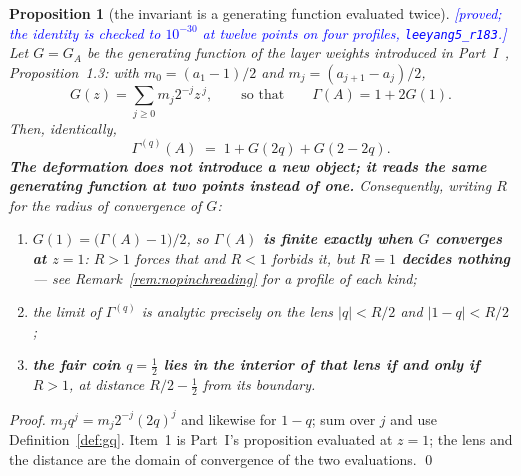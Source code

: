 \documentclass[11pt,a4paper]{article}
\theoremstyle{plain}
\newtheorem{proposition}[theorem]{Proposition}
\theoremstyle{definition}
\theoremstyle{remark}
\newcommand{\STATUS}[1]{\textcolor{blue}{\textsf{[#1]}}}
\newcommand{\Xref}[3]{#3}
\begin{document}
\begin{proposition}[the invariant is a generating function evaluated twice]\label{prop:gqgen}
\STATUS{proved; the identity is checked to $10^{-30}$ at twelve points on four profiles,
\texttt{leeyang5\_r183}.}
Let $G=G_A$ be the generating function of the layer weights introduced in
Part~I~\cite{P1}, Proposition~\Xref{paper}{prop:gengamma}{1.3}: with $m_0=(a_1-1)/2$ and
$m_j=(a_{j+1}-a_j)/2$,
\[
  G(z)=\sum_{j\ge0}m_j2^{-j}z^{\,j},
  \qquad\text{so that}\qquad \Gamma(A)=1+2G(1).
\]
Then, identically,
\[
  \Gamma^{(q)}(A)\;=\;1+G(2q)+G(2-2q).
\]
\textbf{The deformation does not introduce a new object; it reads the same generating function
at two points instead of one.} Consequently, writing $R$ for the radius of convergence of $G$:
\begin{enumerate}
\item $G(1)=\bigl(\Gamma(A)-1\bigr)/2$, so \textbf{$\Gamma(A)$ is finite exactly when $G$
      converges at $z=1$}: $R>1$ forces that and $R<1$ forbids it, but \textbf{$R=1$ decides
      nothing} --- see Remark~\ref{rem:nopinchreading} for a profile of each kind;
\item the limit of $\Gamma^{(q)}$ is analytic precisely on the lens
      $|q|<R/2$ \emph{and} $|1-q|<R/2$;
\item \textbf{the fair coin $q=\tfrac12$ lies in the interior of that lens if and only if
      $R>1$}, at distance $R/2-\tfrac12$ from its boundary.
\end{enumerate}
\end{proposition}

\begin{proof}
$m_jq^{j}=m_j2^{-j}(2q)^{j}$ and likewise for $1-q$; sum over $j$ and use
Definition~\ref{def:gq}. Item~1 is Part~I's proposition evaluated at $z=1$; the lens and the
distance are the domain of convergence of the two evaluations. \qed
\end{proof}
\end{document}
